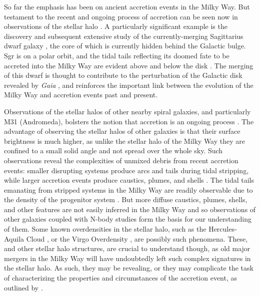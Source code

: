 So far the emphasis has been on ancient accretion events in the Milky Way. But testament to the recent and ongoing process of accretion can be seen now in observations of the stellar halo \parencite[e.g. the `field of streams';][]{belokurov06}. A particularly significant example is the discovery and subsequent extensive study of the currently-merging Sagittarius dwarf galaxy \parencite[Sgr;][]{ibata94}, the core of which is currently hidden behind the Galactic bulge. Sgr is on a polar orbit, and the tidal tails reflecting its doomed fate to be accreted into the Milky Way are evident above and below the disk \parencite{majewski03,belokurov06}. The merging of this dwarf is thought to contribute to the perturbation of the Galactic disk revealed by \textit{Gaia} \parencite[see the previous section and][]{antoja18,laporte19}, and reinforces the important link between the evolution of the Milky Way and accretion events past and present.

Observations of the stellar halos of other nearby spiral galaxies, and particularly M31 (Andromeda), bolsters the notion that accretion is an ongoing process \parencite{mcconnachie09,martinez-delgado10}. The advantage of observing the stellar halos of other galaxies is that their surface brightness is much higher, as unlike the stellar halo of the Milky Way they are confined to a small solid angle and not spread over the whole sky. Such observations reveal the complexities of unmixed debris from recent accretion events: smaller disrupting systems produce arcs and tails during tidal stripping, while larger accretion events produce caustics, plumes, and shells \parencite[][provides a good overview of such phenomena]{johnston08}. The tidal tails emanating from stripped systems in the Milky Way are readily observable due to the density of the progenitor system \parencite[e.g.][]{belokurov06}. But more diffuse caustics, plumes, shells, and other features are not easily inferred in the Milky Way and so observations of other galaxies coupled with N-body studies form the basis for our understanding of them. Some known overdensities in the stellar halo, such as the Hercules-Aquila Cloud \parencite{belokurov07b}, or the Virgo Overdensity \parencite{juric08}, are possibly such phenomena. These, and other stellar halo structures, are crucial to understand though, as old major mergers in the Milky Way will have undoubtedly left such complex signatures in the stellar halo. As such, they may be revealing, or they may complicate the task of characterizing the properties and circumstances of the accretion event, as outlined by \textcite{jean-baptiste17}.

